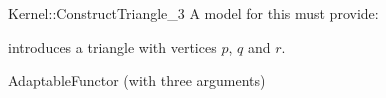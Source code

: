 \begin{ccRefFunctionObjectConcept}{Kernel::ConstructTriangle_3}
A model for this must provide:


            {introduces a triangle  with vertices $p$, $q$ and $r$.}

\ccRefines
AdaptableFunctor (with three arguments)

\ccSeeAlso
{}\\

\end{ccRefFunctionObjectConcept}
